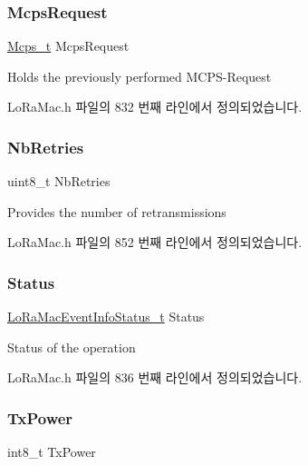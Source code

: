 \subsubsection{\texorpdfstring{Mcps\+Request}{McpsRequest}}
{\footnotesize\ttfamily \mbox{\hyperlink{group___l_o_r_a_m_a_c_ga670d0c87a52aeb13391f303a4cf94f00}{Mcps\+\_\+t}} Mcps\+Request}

Holds the previously performed M\+C\+P\+S-\/\+Request 

Lo\+Ra\+Mac.\+h 파일의 832 번째 라인에서 정의되었습니다.

\mbox{\label{structs_mcps_confirm_a87c781229ed6a79169564bbed6581f29}} 
\subsubsection{\texorpdfstring{Nb\+Retries}{NbRetries}}
{\footnotesize\ttfamily uint8\+\_\+t Nb\+Retries}

Provides the number of retransmissions 

Lo\+Ra\+Mac.\+h 파일의 852 번째 라인에서 정의되었습니다.

\mbox{\label{structs_mcps_confirm_ab360e499d5a7a9e0aa7b4df7239633b5}} 
\subsubsection{\texorpdfstring{Status}{Status}}
{\footnotesize\ttfamily \mbox{\hyperlink{group___l_o_r_a_m_a_c_gac6ffc346a4c767f7a743c87a686c51b4}{Lo\+Ra\+Mac\+Event\+Info\+Status\+\_\+t}} Status}

Status of the operation 

Lo\+Ra\+Mac.\+h 파일의 836 번째 라인에서 정의되었습니다.

\mbox{\label{structs_mcps_confirm_a037b4f849fa8ed4aa1d3c58aef2b28ec}} 
\subsubsection{\texorpdfstring{Tx\+Power}{TxPower}}
{\footnotesize\ttfamily int8\+\_\+t Tx\+Power}

